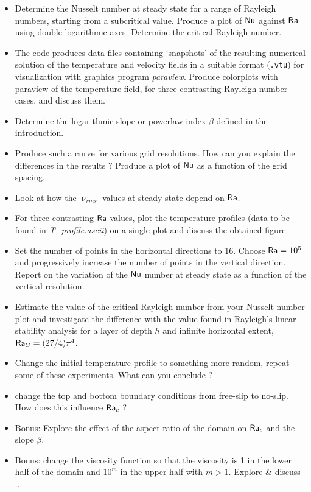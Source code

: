 \begin{itemize}
\item Determine the Nusselt number at steady state for a range of Rayleigh numbers, 
starting from a subcritical value. 
Produce a plot of ${\mathsf{Nu}}$ against ${\mathsf{Ra}}$ using double logarithmic axes. 
Determine the critical Rayleigh number. 

\item The code produces data files containing ‘snapshots’ of the resulting numerical solution 
of the temperature and velocity fields in a suitable format ({\tt .vtu}) for visualization with 
graphics program {\sl paraview}. 
Produce colorplots with paraview of the temperature field, for three contrasting Rayleigh number cases, 
and discuss them.

\item Determine the logarithmic slope or powerlaw index $\beta$ defined in the introduction.

\item Produce such a curve for various grid resolutions. How can you explain the differences in 
the results ? Produce a plot of ${\mathsf{Nu}}$ as a function of the grid spacing. 

\item Look at how the $\upnu_{rms}$ values at steady state depend on ${\mathsf{Ra}}$. 

\item For three contrasting ${\mathsf{Ra}}$ values, plot the temperature profiles 
(data to be found in {\sl T\_profile.ascii}) on a single plot and discuss the obtained figure.

\item Set the number of points in the horizontal directions to 16. Choose ${\mathsf{Ra}}=10^5$ 
and progressively increase the number 
of points in the vertical direction. Report on the variation of the ${\mathsf{Nu}}$ number at steady 
state as a function of the vertical resolution.

\item Estimate the value of the critical Rayleigh number from your Nusselt number plot and 
investigate the difference with the value found in Rayleigh's linear stability analysis 
for a layer of depth $h$ and infinite horizontal extent, ${\mathsf{Ra}}_C = (27/4)  \pi^4$.

\item Change the initial temperature profile to something more random, repeat some of these experiments. 
What can you conclude ?

\item change the top and bottom boundary conditions from free-slip to no-slip. How 
does this influence ${\mathsf{Ra}}_c$ ?

\item Bonus: Explore the effect of the aspect ratio of the domain on ${\mathsf{Ra}}_c$ and the slope $\beta$.

\item Bonus: change the viscosity function so that the viscosity is 1 in the lower half of the domain 
and $10^m$ in the upper half with $m>1$. Explore \& discuss ...

\end{itemize}


